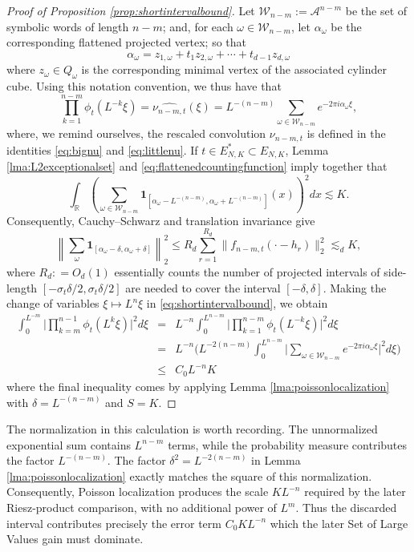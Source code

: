 \documentclass[12pt]{amsart}
\numberwithin{equation}{section}
\begin{document}
\begin{proof}[Proof of Proposition \ref{prop:shortintervalbound}]
Let $\mathcal W_{n-m}:=\mathcal A^{n-m}$ be the set of symbolic words of
length $n-m$; and, for each $\omega\in\mathcal W_{n-m}$, let $\alpha_\omega$ be
the corresponding flattened projected vertex; so that
$$
\alpha_\omega = z_{1,\omega} + t_1 z_{2,\omega} + \cdots + t_{d-1} z_{d,\omega}
$$
where $z_\omega \in Q_{\omega}$ is the corresponding minimal vertex of the associated cylinder cube.
Using this notation convention, we thus have that
\begin{equation}\label{eq:poissonloc1}
\prod_{k = 1}^{n - m}\phi_t (L^{-k} \xi) = \widehat{\nu_{n - m, t}} (\xi)
 =L^{-(n-m)} \sum\limits_{\omega\in\mathcal W_{n-m}} e^{- 2 \pi i \alpha_\omega \xi},
\end{equation}
where, we remind ourselves, the rescaled convolution $\nu_{n-m,t}$ is defined in the identities \eqref{eq:bignu} and
\eqref{eq:littlenu}.
If $t\in E_{N,K}^*\subset E_{N,K}$, Lemma \ref{lma:L2exceptionalset} and
\eqref{eq:flattenedcountingfunction} imply together that
$$
\int_{\mathbb R}\left(
 \sum_{\omega\in\mathcal W_{n-m}}
 \mathbf1_{[\alpha_\omega-L^{-(n-m)},\alpha_\omega+L^{-(n-m)}]}(x)
 \right)^2dx\lesssim K.
$$
Consequently, Cauchy--Schwarz and translation invariance give
\[
 \left\|\sum_\omega
 \mathbf1_{[\alpha_\omega-\delta,\alpha_\omega+\delta]}
 \right\|_2^2
 \leq R_d\sum_{r=1}^{R_d}\|f_{n-m,t}(\cdot-h_r)\|_2^2
 \lesssim_d K,
\]
where $R_d : = O_d(1)$ essentially counts the number of projected intervals of side-length $[-\sigma_t \delta/2, \sigma_t \delta /2]$ are needed to cover the interval $[-\delta, \delta]$.  Making the change of variables
$\xi\mapsto L^n\xi$ in \eqref{eq:shortintervalbound}, we obtain
\begin{eqnarray*}
\int_0^{L^{-m}} \bigg\lvert \prod_{k = m}^{n - 1} \phi_t (L^k \xi )\bigg\vert^2 d \xi & = & L^{-n} \int_{0}^{L^{n - m}} \bigg\lvert \prod_{k = 1}^{n - m} \phi_t (L^{-k} \xi) \bigg\rvert^2 d \xi \\[1ex]
\quad & = & L^{-n} \bigg( L^{-2(n-m)} \int_0^{L^{n-m}} \bigg\lvert \sum\limits_{\omega\in\mathcal W_{n-m}} e^{- 2 \pi i \alpha_\omega \xi} \bigg\rvert^2 d \xi \bigg) \\[1ex]
\quad & \leq & C_0 L^{-n} K
\end{eqnarray*}
where the final inequality comes by applying Lemma \ref{lma:poissonlocalization} with $\delta = L^{-(n-m)}$ and $S = K$.
\end{proof}

The normalization in this calculation is worth recording. The unnormalized exponential sum contains $L^{n-m}$ terms, while the probability measure contributes the factor $L^{-(n-m)}$. The factor $\delta^2=L^{-2(n-m)}$ in Lemma \ref{lma:poissonlocalization} exactly matches the square of this normalization. Consequently, Poisson localization produces the scale $KL^{-n}$ required by the later Riesz-product comparison, with no additional power of $L^m$. Thus the discarded interval contributes precisely the error term $C_0KL^{-n}$ which the later Set of Large Values gain must dominate.
\end{document}
